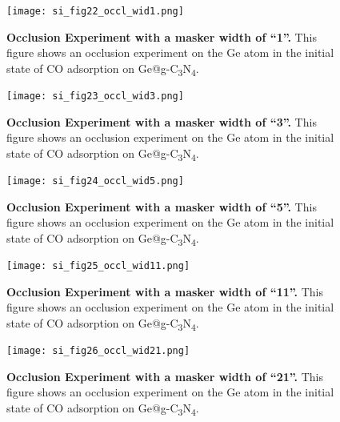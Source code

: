 \begin{figure}
  \centering
  \texttt{[image: si\_fig22\_occl\_wid1.png]}
  \caption{\textbf{Occlusion Experiment with a masker width of “1”.}
  This figure shows an occlusion experiment on the Ge atom in
  the initial state of CO adsorption on Ge@g-C\textsubscript{3}N\textsubscript{4}.}
  \label{si_fig22:occl_wid1}
\end{figure}

\begin{figure}
  \centering
  \texttt{[image: si\_fig23\_occl\_wid3.png]}
  \caption{\textbf{Occlusion Experiment with a masker width of “3”.}
  This figure shows an occlusion experiment on the Ge atom in
  the initial state of CO adsorption on Ge@g-C\textsubscript{3}N\textsubscript{4}.}
  \label{si_fig23:occl_wid3}
\end{figure}

\begin{figure}
  \centering
  \texttt{[image: si\_fig24\_occl\_wid5.png]}
  \caption{\textbf{Occlusion Experiment with a masker width of “5”.}
  This figure shows an occlusion experiment on the Ge atom in
  the initial state of CO adsorption on Ge@g-C\textsubscript{3}N\textsubscript{4}.}
  \label{si_fig24:occl_wid5}
\end{figure}

\begin{figure}
  \centering
  \texttt{[image: si\_fig25\_occl\_wid11.png]}
  \caption{\textbf{Occlusion Experiment with a masker width of “11”.}
  This figure shows an occlusion experiment on the Ge atom in
  the initial state of CO adsorption on Ge@g-C\textsubscript{3}N\textsubscript{4}.}
  \label{si_fig25:occl_wid11}
\end{figure}

\begin{figure}
  \centering
  \texttt{[image: si\_fig26\_occl\_wid21.png]}
  \caption{\textbf{Occlusion Experiment with a masker width of “21”.}
  This figure shows an occlusion experiment on the Ge atom in
  the initial state of CO adsorption on Ge@g-C\textsubscript{3}N\textsubscript{4}.}
  \label{si_fig26:occl_wid21}
\end{figure}

